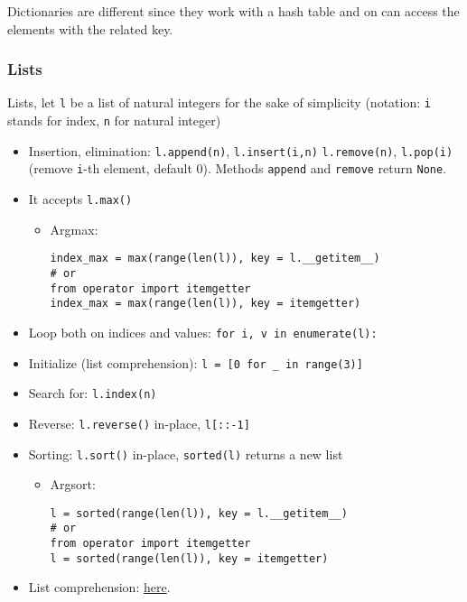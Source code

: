 \documentclass[a4paper,12pt,%
              final%
              ]{article}
\begin{document}
Dictionaries are different since they work with a hash table and on can access the elements with the related key.

\subsubsection{Lists}
Lists, let \verb|l| be a list of natural integers for the sake of simplicity (notation: \verb|i| stands for index, \verb|n| for natural integer)
\begin{itemize}
  \item Insertion, elimination: \verb|l.append(n)|, \verb|l.insert(i,n)| \verb|l.remove(n)|, \verb|l.pop(i)| (remove \texttt{i}-th element, default 0). Methods \texttt{append} and \texttt{remove} return \texttt{None}.
  \item It accepts \verb|l.max()|
    \begin{itemize}
      \item Argmax:
\begin{verbatim}
index_max = max(range(len(l)), key = l.__getitem__)
# or
from operator import itemgetter
index_max = max(range(len(l)), key = itemgetter)
\end{verbatim}
    \end{itemize}
  \item Loop both on indices and values: \verb|for i, v in enumerate(l):|
  \item Initialize (list comprehension): \verb|l = [0 for _ in range(3)]|
  \item Search for: \verb|l.index(n)|
  \item Reverse: \verb|l.reverse()| in-place, \verb|l[::-1]|
  \item Sorting: \verb|l.sort()| in-place, \verb|sorted(l)| returns a new list
    \begin{itemize}
      \item Argsort:
\begin{verbatim}
l = sorted(range(len(l)), key = l.__getitem__)
# or
from operator import itemgetter
l = sorted(range(len(l)), key = itemgetter)
\end{verbatim}
    \end{itemize}
  \item List comprehension: \href{https://www.programiz.com/python-programming/list-comprehension}{here}.
\end{itemize}
\end{document}
